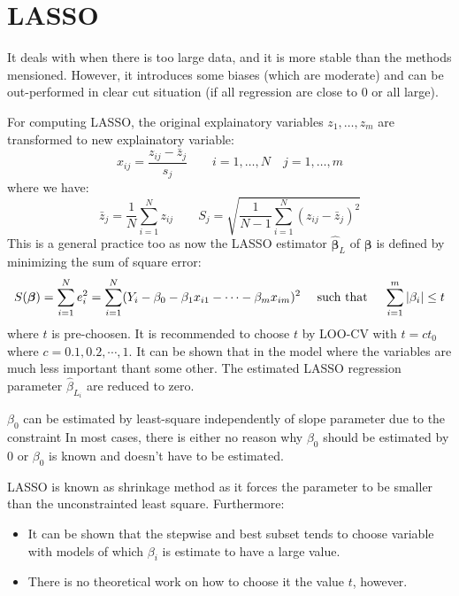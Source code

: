 \section{LASSO}

\begin{remark}
    It deals with when there is too large data, and it is more stable than the methods mensioned. However, it introduces some biases (which are moderate) and can be out-performed in clear cut situation (if all regression are close to $0$ or all large).     
\end{remark}

\begin{remark}
    For computing LASSO, the original explainatory variables $z_1,\dots,z_m$ are transformed to new explainatory variable:
    \begin{equation*}
        x_{ij} = \frac{z_{ij} - \bar{z}_j}{s_j} \qquad i = 1,\dots, N \quad j = 1,\dots,m
    \end{equation*}
    where we have:
    \begin{equation*}
        \bar{z}_j = \frac{1}{N}\sum^N_{i=1}z_{ij} \qquad S_j = \sqrt{\frac{1}{N-1}\sum^N_{i=1}(z_{ij} - \bar{z}_j)^2}
    \end{equation*}
    This is a general practice too as now the LASSO estimator $\hat{\boldsymbol \beta}_L$ of $\boldsymbol \beta$ is defined by minimizing the sum of square error:
    \begin{equation*}
        S(\boldsymbol \beta) = \sum^N_{i=1}e_i^2 = \sum^N_{i=1}(Y_i - \beta_0 - \beta_1x_{i1}-\cdots-\beta_mx_{im})^2 \quad \text{ such that } \quad \sum^m_{i=1} \left| \beta_i \right| \le t
    \end{equation*}
    where $t$ is pre-choosen. It is recommended to choose $t$ by LOO-CV with $t = ct_0$ where $c=0.1,0.2,\cdots,1$.  It can be shown that in the model where the variables are much less important thant some other. The estimated LASSO regression parameter $\hat{\beta}_{L_i}$ are reduced to zero. 
\end{remark}

\begin{remark}
    $\beta_0$ can be estimated by least-square independently of slope parameter due to the constraint In most cases, there is either no reason why $\beta_0$ should be estimated by $0$ or $\beta_0$ is known and doesn't have to be estimated. 
\end{remark}

\begin{remark}
    LASSO is known as shrinkage method as it forces the parameter to be smaller than the unconstrainted least square. Furthermore:
    \begin{itemize}
        \item It can be shown that the stepwise and best subset tends to choose variable with models of which $\beta_i$ is estimate to have a large value.
        \item There is no theoretical work on how to choose it the value $t$, however. 
    \end{itemize}
\end{remark}

